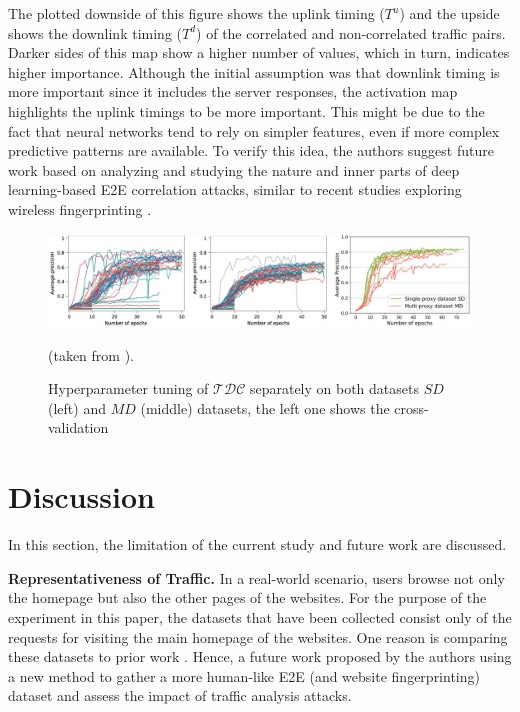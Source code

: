\documentclass[sigconf]{acmart}
\begin{document}
\vspace{2mm}

The plotted downside of this figure shows the uplink timing ($T^u$) and the upside shows the downlink timing ($T^d$) of the correlated and non-correlated traffic pairs. Darker sides of this map show a higher number of values, which in turn, indicates higher importance. Although the initial assumption was that downlink timing is more important since it includes the server responses, the activation map highlights the uplink timings to be more important. This might be due to the fact that neural networks tend to rely on simpler features, even if more complex predictive patterns are available. To verify this idea, the authors suggest future work based on analyzing and studying the nature and inner parts of deep learning-based E2E correlation attacks, similar to recent studies exploring wireless fingerprinting \cite{DLbasedWF}.


\begin{figure}[h!]
  \centering
  \includegraphics[width=17.5cm]{Figure_7.jpg}
  \caption{\textmd{Hyperparameter tuning of \( \mathcal{TDC} \) separately on both datasets $SD$ (left) and $MD$ (middle) datasets, the left one shows the cross-validation}} (taken from \cite{RimmerV}).
  \label{fig:7} 
\end{figure}

\vspace{3mm}

\section{Discussion} \label{8}


In this section, the limitation of the current study and future work are discussed. 

\vspace{3mm}

\textbf{Representativeness of Traffic.} In a real-world scenario, users browse not only the homepage but also the other pages of the websites. For the purpose of the experiment in this paper, the datasets that have been collected consist only of the requests for visiting the main homepage of the websites. One reason is comparing these datasets to prior work \cite{nasr2018deepcorr}. Hence, a future work proposed by the authors using a new method to gather a more human-like E2E (and website fingerprinting) dataset and assess the impact of traffic analysis attacks.
\end{document}

